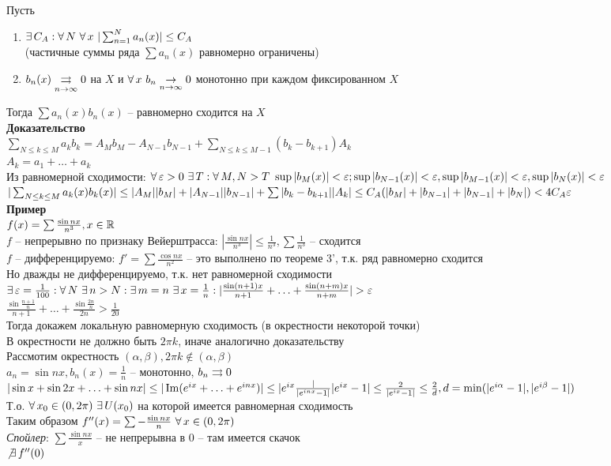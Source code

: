 \documentclass[12pt]{article}
\begin{document}
Пусть \begin{enumerate}
    \item $\ex C_A: \fall N \ \fall x\ |\sum_{n=1}^N a_n(x)|\leq C_A$\\
    (частичные суммы ряда $\sum a_n(x)$ равномерно ограничены)
    \item $b_n(x) \underset{n\rightarrow \infty} {\rightrightarrows} 0$ на $X$ и $\forall\, x\ b_n\underset{n\rightarrow \infty}{\rightarrow} 0$ монотонно при каждом фиксированном $X$
\end{enumerate}
Тогда $\sum a_n(x)b_n(x)$ -- равномерно сходится на $X$\\
\textbf{Доказательство}\\
$\sum_{N \leq k \leq M} a_kb_k = A_Mb_M - A_{N-1}b_{N-1} + \sum_{N \leq k \leq M-1}(b_k-b_{k+1})A_k$\\
$A_k = a_1 + \ldots + a_k$\\
Из равномерной сходимости: $\fall \eps>0\ \ex T: \fall M,N > T\ \sup|b_M(x)|<\eps;\sup|b_{N-1}(x)|<\eps,\sup|b_{M-1}(x)|<\eps,\sup|b_N(x)|<\eps$\\
$|\sum_{N\leq k \leq M} a_k(x)b_k(x)| \leq |A_M||b_M|+|A_{N-1}||b_{N-1}| + \sum |b_k-b_{k+1}||A_k| \leq C_A(|b_M| + |b_{N-1}|+|b_{N-1}|+|b_N|) < 4C_A\varepsilon$\\
\textbf{Пример}\\
$f(x) = \sum \frac{\sin nx}{n^3}, x \in \mathbb{R}$\\
$f$ -- непрерывно по признаку Вейерштрасса: $|\frac{\sin nx}{n^3}| \leq \frac1{n^3}, \sum \frac1{n^3}$ -- сходится\\
$f$ -- дифференцируемо: $f' = \sum \frac{\cos nx}{n^2}$ -- это выполнено по теореме 3', т.к. ряд равномерно сходится\\
Но дважды не дифференцируемо, т.к. нет равномерной сходимости\\
$\exists\, \varepsilon=\frac1{100}: \forall\, N\ \exists\, n > N: \exists\, m=n\ \exists\, x=\frac1n: |\frac{\sin (n+1)x}{n+1} + \ldots + \frac{\sin (n+m)x}{n+m}| > \varepsilon$\\
$\frac{\sin \frac{n+1}n}{n+1} + \ldots + \frac{\sin \frac{2n}n}{2n} > \frac1{20}$\\
Тогда докажем локальную равномерную сходимость (в окрестности некоторой точки)\\
В окрестности не должно быть $2\pi k$, иначе аналогично доказательству\\
Рассмотим окрестность $(\alpha, \beta), 2\pi k \not\in (\alpha, \beta)$\\
$a_n = \sin nx, b_n(x) = \frac1n$ -- монотонно, $b_n \rightrightarrows 0$\\
$|\sin x + \sin 2x + \ldots + \sin nx| \leq |\operatorname{Im}(e^{ix} + \ldots + e^{inx})| \leq |e^{ix}\frac|{|e^{inx}-1|}{|e^{ix}-1|} \leq \frac2{|e^{ix}-1|} \leq \frac2d, d = \min(|e^{i\alpha}-1|, |e^{i\beta}-1|)$\\
Т.о. $\forall\, x_0 \in (0, 2\pi)\ \exists\, U(x_0)$ на которой имеется равномерная сходимость\\
Таким образом $f''(x) = \sum - \frac{\sin nx}{n}\ \forall\, x \in (0, 2\pi)$\\
\textit{Спойлер}: $\sum \frac{\sin nx}{x}$ -- не непрерывна в 0 -- там имеется скачок\\
$\not \exists\, f''(0)$\\
\end{document}
